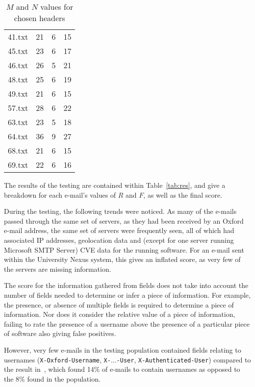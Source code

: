 \begin{table}
\begin{tabular}{@{}cccc@{}}
41.txt & 21           & 6                     & 15                 \\
45.txt & 23           & 6                     & 17                 \\
46.txt & 26           & 5                     & 21                 \\
48.txt & 25           & 6                     & 19                 \\
49.txt & 21           & 6                     & 15                 \\
57.txt & 28           & 6                     & 22                 \\
63.txt & 23           & 5                     & 18                 \\
64.txt & 36           & 9                     & 27                 \\
68.txt & 21           & 6                     & 15                 \\
69.txt & 22           & 6                     & 16                 \\
\bottomrule
\end{tabular}
\caption{$M$ and $N$ values for chosen headers}
\label{tab:sammn}
\end{table}

The results of the testing are contained within Table~\ref{tab:res}, and give a
breakdown for each e-mail's values of $R$ and $F$, as well as the final score.

During the testing, the following trends were noticed.  As many of the e-mails
passed through the same set of servers, as they had been received by an Oxford
e-mail address, the same set of servers were frequently seen, all of which had
associated IP addresses, geolocation data and (except for one server running
Microsoft SMTP Server) CVE data for the running software.  For an e-mail sent
within the University Nexus system, this gives an inflated score, as very few
of the servers are missing information.

The score for the information gathered from fields does not take into account
the number of fields needed to determine or infer a piece of information. For
example, the presence, or absence of multiple fields is required to determine a
piece of information.  Nor does it consider the relative value of a piece of
information, failing to rate the presence of a username above the presence of a
particular piece of software also giving false positives.

However, very few e-mails in the testing population contained fields relating
to usernames (\texttt{X-Oxford-Username}, \texttt{X-}$\ldots$\texttt{-User},
\texttt{X-Authenticated-User}) compared to the result
in~\cite{nurse2015investigating}, which found 14\% of e-mails to contain
usernames as opposed to the 8\% found in the population.

